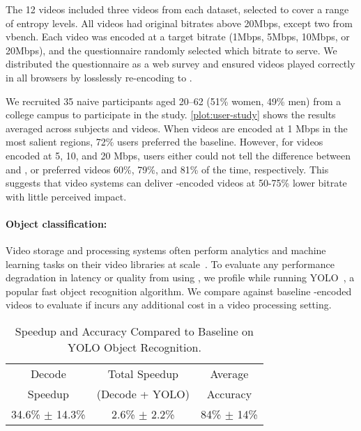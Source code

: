 The 12 videos included three videos from each dataset, selected to cover a range of entropy levels.
All videos had original bitrates above 20Mbps, except two from vbench.
Each video was encoded at a target bitrate (1Mbps, 5Mbps, 10Mbps, or 20Mbps), and the questionnaire randomly selected which bitrate to serve.
We distributed the questionnaire as a web survey and ensured videos played correctly in all browsers by losslessly re-encoding to \avc.

We recruited 35 naive participants aged 20--62 (51\% women, 49\% men) from a college campus to participate in the study.
\ref{plot:user-study} shows the results averaged across subjects and videos.
When \name videos are encoded at 1 Mbps in the most salient regions, 72\% users preferred the \hevc baseline.
However, for \name videos encoded at 5, 10, and 20 Mbps, users either could not tell the difference between \hevc and \name, or preferred \name videos 60\%, 79\%, and 81\% of the time, respectively.
This suggests that video systems can deliver \name-encoded videos at 50-75\% lower bitrate with little perceived impact.

\userStudyFigure



\paragraph{Object classification: } Video storage and processing systems often perform analytics and machine learning tasks on their video libraries at scale~\cite{poms2018scanner,shen2017deepvideo,zhang2017livevideoanalytics}.
To evaluate any performance degradation in latency or quality from using \nameCompress, we profile \name while running  YOLO~\cite{redmon2017yolo}, a popular fast object recognition algorithm.
We compare against baseline \hevc-encoded videos to evaluate if \name incurs any additional cost in a video processing setting.

\begin{table}[h]
  \centering
  \caption{\name Speedup and Accuracy Compared to \hevc Baseline on YOLO Object Recognition.}
  \label{table:yolo}
\begin{tabular}{ccc} \toprule
  Decode              & Total Speedup             &  Average    \\
  Speedup             & (Decode + YOLO)           & Accuracy \\ \midrule
  34.6\% $\pm$ 14.3\% & 2.6\% $\pm$ 2.2\% & 84\% $\pm$ 14\% \\ \bottomrule
\end{tabular}
\end{table}

